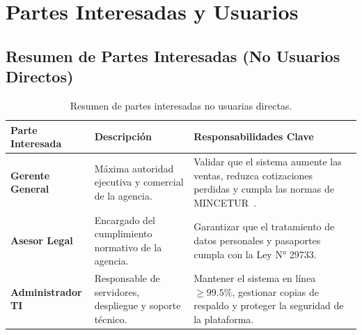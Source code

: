 \section{Partes Interesadas y Usuarios}

\subsection{Resumen de Partes Interesadas (No Usuarios Directos)}
\begin{table}[H]
\centering
\footnotesize
\begin{tabularx}{\textwidth}{lLL}
\toprule
\textbf{Parte Interesada} & \textbf{Descripción} & \textbf{Responsabilidades Clave} \\
\midrule
\textbf{Gerente General} & Máxima autoridad ejecutiva y comercial de la agencia. & Validar que el sistema aumente las ventas, reduzca cotizaciones perdidas y cumpla las normas de MINCETUR~\cite{mincetur2020}. \\ %
\textbf{Asesor Legal} & Encargado del cumplimiento normativo de la agencia. & Garantizar que el tratamiento de datos personales y pasaportes cumpla con la Ley N° 29733. \\
\textbf{Administrador TI} & Responsable de servidores, despliegue y soporte técnico. & Mantener el sistema en línea $\ge 99.5\%$, gestionar copias de respaldo y proteger la seguridad de la plataforma. \\
\bottomrule
\end{tabularx}
\caption{Resumen de partes interesadas no usuarias directas.}\label{tab:stakeholders}
\end{table}


